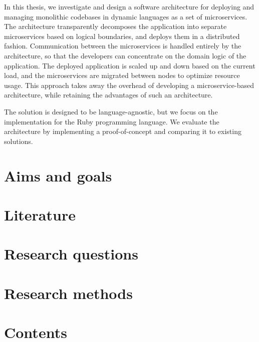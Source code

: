 \documentclass[12pt]{article}
\begin{document}
	In this thesis, we investigate and design a software architecture for deploying and managing monolithic codebases in dynamic languages as a set of microservices.
	The architecture transparently decomposes the application into separate microservices based on logical boundaries, and deploys them in a distributed fashion.
	Communication between the microservices is handled entirely by the architecture, so that the developers can concentrate on the domain logic of the application.
	The deployed application is scaled up and down based on the current load, and the microservices are migrated between nodes to optimize resource usage.
	This approach takes away the overhead of developing a microservice-based architecture, while retaining the advantages of such an architecture.

	The solution is designed to be language-agnostic, but we focus on the implementation for the Ruby programming language.
	We evaluate the architecture by implementing a proof-of-concept and comparing it to existing solutions.

	\clearpage

	\section{Aims and goals}

	\clearpage

	\section{Literature}

	\clearpage

	\section{Research questions}

	\clearpage

	\section{Research methods}

	\clearpage

	\section{Contents}

	\clearpage


	\nocite{*}

	\printbibliography[heading=bibintoc]
\end{document}
